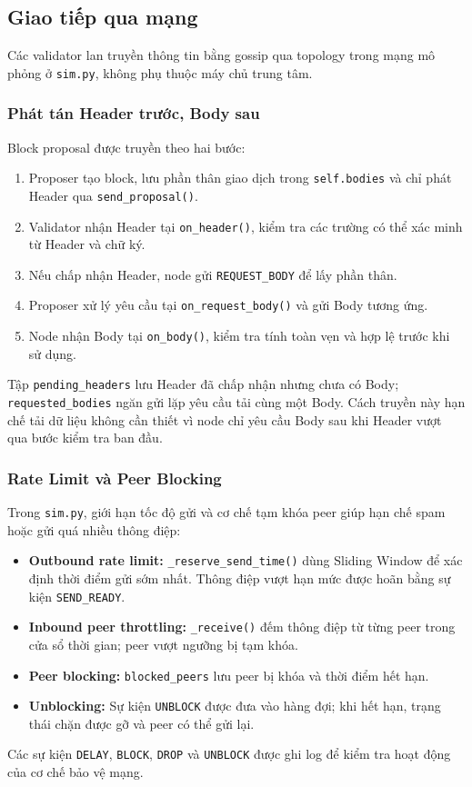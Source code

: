 \subsection{Giao tiếp qua mạng}

Các validator lan truyền thông tin bằng gossip qua topology trong mạng mô phỏng ở \texttt{sim.py}, không phụ thuộc máy chủ trung tâm.

\subsubsection{Phát tán Header trước, Body sau}

Block proposal được truyền theo hai bước:
\begin{enumerate}
    \item Proposer tạo block, lưu phần thân giao dịch trong \texttt{self.bodies} và chỉ phát Header qua \texttt{send\_proposal()}.
    \item Validator nhận Header tại \texttt{on\_header()}, kiểm tra các trường có thể xác minh từ Header và chữ ký.
    \item Nếu chấp nhận Header, node gửi \texttt{REQUEST\_BODY} để lấy phần thân.
    \item Proposer xử lý yêu cầu tại \texttt{on\_request\_body()} và gửi Body tương ứng.
    \item Node nhận Body tại \texttt{on\_body()}, kiểm tra tính toàn vẹn và hợp lệ trước khi sử dụng.
\end{enumerate}
Tập \texttt{pending\_headers} lưu Header đã chấp nhận nhưng chưa có Body; \texttt{requested\_bodies} ngăn gửi lặp yêu cầu tải cùng một Body. Cách truyền này hạn chế tải dữ liệu không cần thiết vì node chỉ yêu cầu Body sau khi Header vượt qua bước kiểm tra ban đầu.


\subsubsection{Rate Limit và Peer Blocking}

Trong \texttt{sim.py}, giới hạn tốc độ gửi và cơ chế tạm khóa peer giúp hạn chế spam hoặc gửi quá nhiều thông điệp:
\begin{itemize}
    \item \textbf{Outbound rate limit:} \texttt{\_reserve\_send\_time()} dùng Sliding Window để xác định thời điểm gửi sớm nhất. Thông điệp vượt hạn mức được hoãn bằng sự kiện \texttt{SEND\_READY}.
    \item \textbf{Inbound peer throttling:} \texttt{\_receive()} đếm thông điệp từ từng peer trong cửa sổ thời gian; peer vượt ngưỡng bị tạm khóa.
    \item \textbf{Peer blocking:} \texttt{blocked\_peers} lưu peer bị khóa và thời điểm hết hạn.
    \item \textbf{Unblocking:} Sự kiện \texttt{UNBLOCK} được đưa vào hàng đợi; khi hết hạn, trạng thái chặn được gỡ và peer có thể gửi lại.
\end{itemize}
Các sự kiện \texttt{DELAY}, \texttt{BLOCK}, \texttt{DROP} và \texttt{UNBLOCK} được ghi log để kiểm tra hoạt động của cơ chế bảo vệ mạng.

